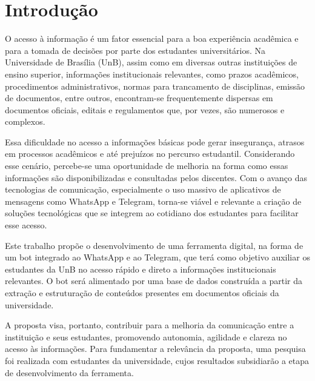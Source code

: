 \chapter[Introdução]{Introdução}

O acesso à informação é um fator essencial para a boa experiência acadêmica e para a tomada de decisões por parte dos estudantes universitários. Na Universidade de Brasília (UnB), assim como em diversas outras instituições de ensino superior, informações institucionais relevantes, como prazos acadêmicos, procedimentos administrativos, normas para trancamento de disciplinas, emissão de documentos, entre outros, encontram-se frequentemente dispersas em documentos oficiais, editais e regulamentos que, por vezes, são numerosos e complexos.


Essa dificuldade no acesso a informações básicas pode gerar insegurança, atrasos em processos acadêmicos e até prejuízos no percurso estudantil. Considerando esse cenário, percebe-se uma oportunidade de melhoria na forma como essas informações são disponibilizadas e consultadas pelos discentes. Com o avanço das tecnologias de comunicação, especialmente o uso massivo de aplicativos de mensagens como WhatsApp e Telegram, torna-se viável e relevante a criação de soluções tecnológicas que se integrem ao cotidiano dos estudantes para facilitar esse acesso.


Este trabalho propõe o desenvolvimento de uma ferramenta digital, na forma de um bot integrado ao WhatsApp e ao Telegram, que terá como objetivo auxiliar os estudantes da UnB no acesso rápido e direto a informações institucionais relevantes. O bot será alimentado por uma base de dados construída a partir da extração e estruturação de conteúdos presentes em documentos oficiais da universidade.

A proposta visa, portanto, contribuir para a melhoria da comunicação entre a instituição e seus estudantes, promovendo autonomia, agilidade e clareza no acesso às informações. Para fundamentar a relevância da proposta, uma pesquisa foi realizada com estudantes da universidade, cujos resultados subsidiarão a etapa de desenvolvimento da ferramenta.

